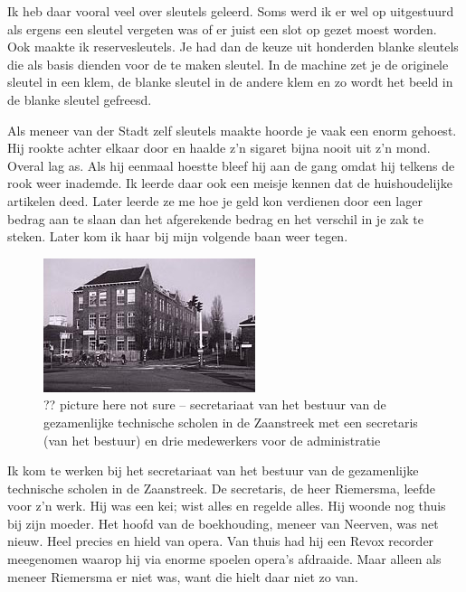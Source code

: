 \documentclass[10pt,twoside, openright]{memoir}
\begin{document}
Ik heb daar vooral veel over sleutels geleerd. Soms werd ik er wel op uitgestuurd als ergens een sleutel vergeten was of er juist een slot op gezet moest worden. Ook maakte ik reservesleutels. Je had dan de keuze uit honderden blanke sleutels die als basis dienden voor de te maken sleutel. In de machine zet je de originele sleutel in een klem, de blanke sleutel in de andere klem en zo wordt het beeld in de blanke sleutel gefreesd. 

Als meneer van der Stadt zelf sleutels maakte hoorde je vaak een enorm gehoest. Hij rookte achter elkaar door en haalde z’n sigaret bijna nooit uit z’n mond. Overal lag as. Als hij eenmaal hoestte bleef hij aan de gang omdat hij telkens de rook weer inademde. Ik leerde daar ook een meisje kennen dat de huishoudelijke artikelen deed. Later leerde ze me hoe je geld kon verdienen door een lager bedrag aan te slaan dan het afgerekende bedrag en het verschil in je zak te steken. Later kom ik haar bij mijn volgende baan weer tegen. 

\begin{figure}
\includegraphics[width=\textwidth]{img/ch41/ambachtschool}
\caption*{\footnotesize ?? picture here not sure -- secretariaat van het bestuur van de gezamenlijke technische scholen in de Zaanstreek met een secretaris (van het bestuur) en drie medewerkers voor de administratie}
\end{figure}

Ik kom te werken bij het secretariaat van het bestuur van de gezamenlijke technische scholen in de Zaanstreek. De secretaris, de heer Riemersma, leefde voor z'n werk. Hij was een kei; wist alles en regelde alles. Hij woonde nog thuis bij zijn moeder. Het hoofd van de boekhouding, meneer van Neerven, was net nieuw. Heel precies en hield van opera. Van thuis had hij een Revox recorder meegenomen waarop hij via enorme spoelen opera's afdraaide. Maar alleen als meneer Riemersma er niet was, want die hielt daar niet zo van.
\end{document}
